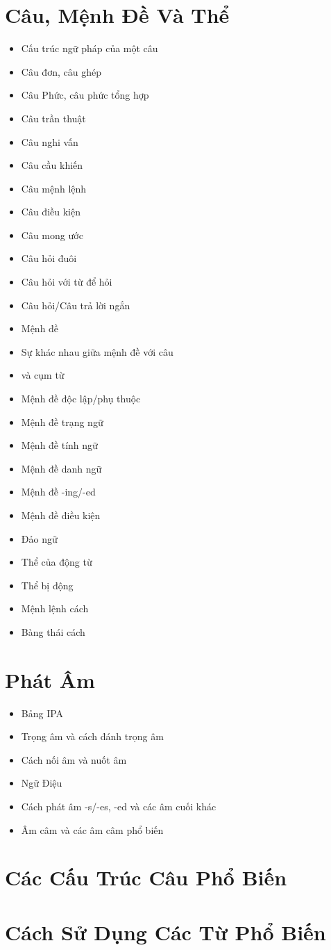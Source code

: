 \chapter{Câu, Mệnh Đề Và Thể}
\begin{multicols}{2}
\begin{itemize}
    \item Cấu trúc ngữ pháp của một câu
    \item Câu đơn, câu ghép
    \item Câu Phức, câu phức tổng hợp
    \item Câu trần thuật
    \item Câu nghi vấn
    \item Câu cầu khiến
    \item Câu mệnh lệnh
    \item Câu điều kiện
    \item Câu mong ước
    \item Câu hỏi đuôi
    \item Câu hỏi với từ để hỏi
    \item Câu hỏi/Câu trả lời ngắn
    \item Mệnh đề
    \item Sự khác nhau giữa mệnh đề với câu   
    \item và cụm từ
    \item Mệnh đề độc lập/phụ thuộc
    \item Mệnh đề trạng ngữ
    \item Mệnh đề tính ngữ
    \item Mệnh đề danh ngữ
    \item Mệnh đề -ing/-ed
    \item Mệnh đề điều kiện
    \item Đảo ngữ
    \item Thể của động từ
    \item Thể bị động
    \item Mệnh lệnh cách
    \item Bàng thái cách
\end{itemize}
\end{multicols}

\chapter{Phát Âm}
\begin{multicols}{2}
\begin{itemize}
    \item Bảng IPA
    \item Trọng âm và cách đánh trọng âm
    \item Cách nối âm và nuốt âm
    \item Ngữ Điệu
    \item Cách phát âm -s/-es, -ed và các âm cuối khác
    \item Âm câm và các âm câm phổ biến
\end{itemize}
\end{multicols}

\chapter{Các Cấu Trúc Câu Phổ Biến}
\chapter{Cách Sử Dụng Các Từ Phổ Biến}
